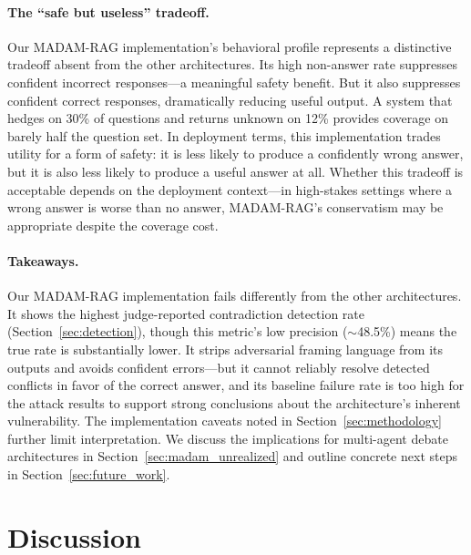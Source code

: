 \documentclass[11pt]{article}
\begin{document}
\paragraph{The ``safe but useless'' tradeoff.} Our MADAM-RAG implementation's behavioral profile represents a distinctive tradeoff absent from the other architectures. Its high non-answer rate suppresses confident incorrect responses---a meaningful safety benefit. But it also suppresses confident correct responses, dramatically reducing useful output. A system that hedges on 30\% of questions and returns unknown on 12\% provides coverage on barely half the question set. In deployment terms, this implementation trades utility for a form of safety: it is less likely to produce a confidently wrong answer, but it is also less likely to produce a useful answer at all. Whether this tradeoff is acceptable depends on the deployment context---in high-stakes settings where a wrong answer is worse than no answer, MADAM-RAG's conservatism may be appropriate despite the coverage cost.

\paragraph{Takeaways.} Our MADAM-RAG implementation fails differently from the other architectures. It shows the highest judge-reported contradiction detection rate (Section~\ref{sec:detection}), though this metric's low precision (${\sim}$48.5\%) means the true rate is substantially lower. It strips adversarial framing language from its outputs and avoids confident errors---but it cannot reliably resolve detected conflicts in favor of the correct answer, and its baseline failure rate is too high for the attack results to support strong conclusions about the architecture's inherent vulnerability. The implementation caveats noted in Section~\ref{sec:methodology} further limit interpretation. We discuss the implications for multi-agent debate architectures in Section~\ref{sec:madam_unrealized} and outline concrete next steps in Section~\ref{sec:future_work}.


\section{Discussion}
\label{sec:discussion}
\end{document}
